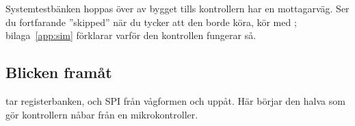 Systemtestbänken hoppas över av bygget tills kontrollern har en mottagarväg. Ser du fortfarande
”skipped” när du tycker att den borde köra, kör med ; bilaga~\ref{app:sim}
förklarar varför den kontrollen fungerar så.

\subsection*{Blicken framåt}
 tar registerbanken, och SPI från vågformen och uppåt. Här börjar den halva som gör
kontrollern nåbar från en mikrokontroller.
